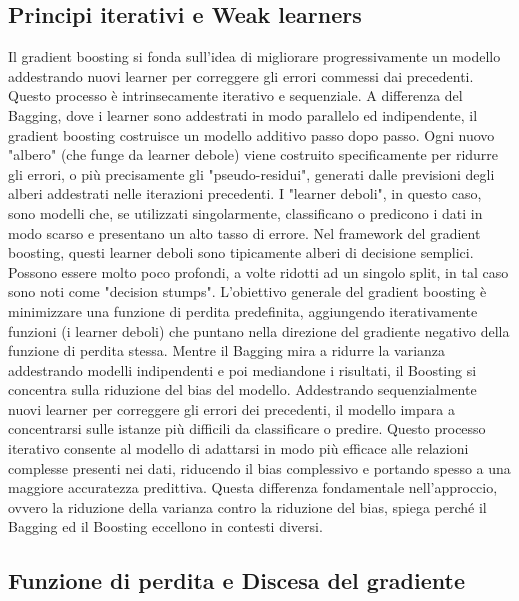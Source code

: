 \documentclass[a4paper,12pt]{report}
\begin{document}
	\subsection{Principi iterativi e Weak learners}
	
	Il gradient boosting si fonda sull'idea di migliorare progressivamente un modello addestrando nuovi learner per correggere gli errori commessi dai precedenti. Questo processo è intrinsecamente iterativo e sequenziale. A differenza del Bagging, dove i learner sono addestrati in modo parallelo ed indipendente, il gradient boosting costruisce un modello additivo passo dopo passo. Ogni nuovo "albero" (che funge da learner debole) viene costruito specificamente per ridurre gli errori, o più precisamente gli "pseudo-residui", generati dalle previsioni degli alberi addestrati nelle iterazioni precedenti.
	I "learner deboli", in questo caso, sono modelli che, se utilizzati singolarmente, classificano o predicono i dati in modo scarso e presentano un alto tasso di errore. Nel framework del gradient boosting, questi learner deboli sono tipicamente alberi di decisione semplici. Possono essere molto poco profondi, a volte ridotti ad un singolo split, in tal caso sono noti come "decision stumps". L'obiettivo generale del gradient boosting è minimizzare una funzione di perdita predefinita, aggiungendo iterativamente funzioni (i learner deboli) che puntano nella direzione del gradiente negativo della funzione di perdita stessa. Mentre il Bagging mira a ridurre la varianza addestrando modelli indipendenti e poi mediandone i risultati, il Boosting si concentra sulla riduzione del bias del modello. Addestrando sequenzialmente nuovi learner per correggere gli errori dei precedenti, il modello impara a concentrarsi sulle istanze più difficili da classificare o predire. Questo processo iterativo consente al modello di adattarsi in modo più efficace alle relazioni complesse presenti nei dati, riducendo il bias complessivo e portando spesso a una maggiore accuratezza predittiva. Questa differenza fondamentale nell'approccio, ovvero la riduzione della varianza contro la riduzione del bias, spiega perché il Bagging ed il Boosting eccellono in contesti diversi.
	
	\subsection{Funzione di perdita e Discesa del gradiente}
	
\end{document}

